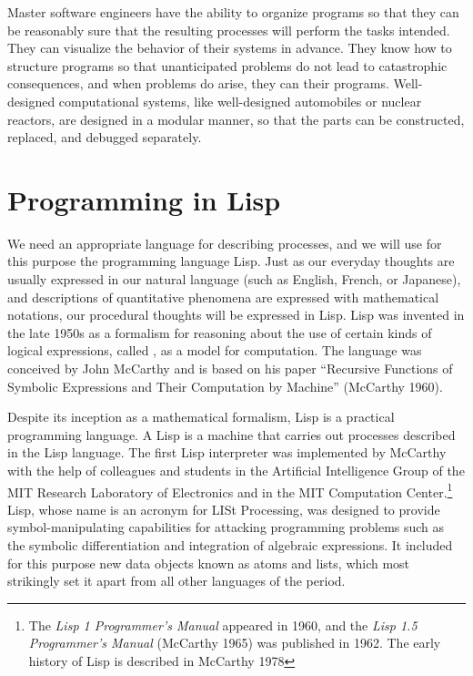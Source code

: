 Master software engineers have the ability to organize programs so
that they can be reasonably sure that the resulting processes will
perform the tasks intended.  They can visualize the behavior of their
systems in advance.  They know how to structure programs so that
unanticipated problems do not lead to catastrophic consequences, and
when problems do arise, they can  their programs.
Well-designed computational systems, like well-designed automobiles or
nuclear reactors, are designed in a modular manner, so that the parts
can be constructed, replaced, and debugged separately.

\section*{Programming in Lisp}

We need an appropriate language for describing processes, and we will
use for this purpose the programming language Lisp.  Just as our
everyday thoughts are usually expressed in our natural language (such
as English, French, or Japanese), and descriptions of quantitative
phenomena are expressed with mathematical notations, our procedural
thoughts will be expressed in Lisp.  Lisp was invented in
the late 1950s as a formalism for reasoning about the use of certain
kinds of logical expressions, called , as a
model for computation.  The language was conceived by John McCarthy and is based on his paper ``Recursive
Functions of Symbolic Expressions and Their Computation by Machine''
(McCarthy 1960).

Despite its inception as a mathematical formalism, Lisp is a practical
programming language.  A Lisp  is a machine that
carries out processes described in the Lisp language.  The first Lisp
interpreter was implemented by McCarthy with the
help of colleagues and students in the Artificial Intelligence Group
of the MIT Research Laboratory of Electronics and in the MIT
Computation Center.\footnote{The \textit{Lisp 1 Programmer's Manual}
  appeared in 1960, and the \textit{Lisp 1.5 Programmer's Manual}
  (McCarthy 1965) was published in 1962.  The early history of Lisp is
  described in McCarthy 1978} Lisp, whose name is an
acronym for LISt Processing, was designed to provide
symbol-manipulating capabilities for attacking programming problems
such as the symbolic differentiation and integration of algebraic
expressions.  It included for this purpose new data objects known as
atoms and lists, which most strikingly set it apart from all other
languages of the period.

